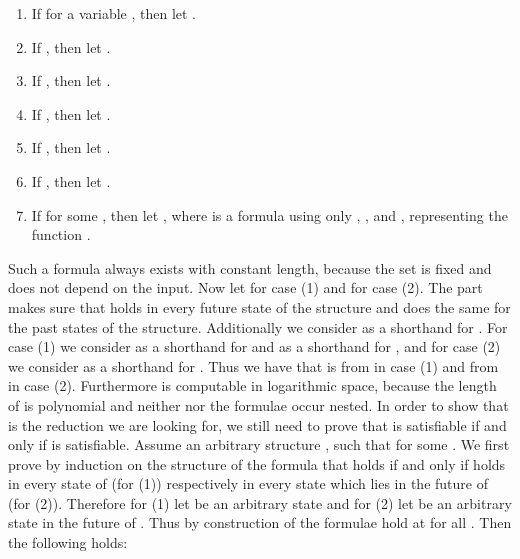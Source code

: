     \begin{enumerate}[]
    \item If  for a variable , then let .
    \item If , then let .
    \item If , then let .
    \item If , then let .
    \item If , then let .
    \item If , then let .
    \item If  for some ,
          then let ,
          where  is a formula using only , , and , representing the function .
    \end{enumerate}

    Such a formula  always exists with constant length, because the set  is fixed and does not depend on the input.
    Now let  for case (1) and
     for case (2). The part  makes sure that  holds in every
    future state of the structure and  does the same for the past states of the structure.
    Additionally we consider  as a shorthand for .
For case (1) we consider  as a shorthand for  and 
    as a shorthand for , and for case (2) we consider  as a shorthand for . Thus we have that  is from  in case (1) and from  in case (2).
Furthermore  is computable in logarithmic space, because the length of  is polynomial
    and neither  nor the formulae  occur nested. In order to show that
     is the reduction we are looking for, we still need to prove that  is satisfiable if and only if
     is satisfiable. Assume an arbitrary structure , such that
     for some . We first prove by induction on the structure of the formula that  holds if and only if  holds
    in every state  of  (for (1)) respectively in every state which lies in the future of  (for (2)).
    Therefore for (1) let  be an arbitrary state and for (2) let  be an arbitrary state in the future of . Thus by construction
    of  the formulae  hold at  for all . Then the following holds:

